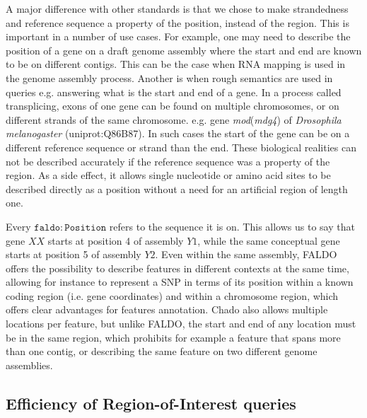 A major difference with other standards is that we chose to make strandedness and reference sequence a property of the position, instead of the region.
This is important in a number of use cases.
For example, one may need to describe the position of a gene on a draft genome assembly where the start and end are known to be on different contigs.
This can be the case when RNA mapping is used in the genome assembly process.
Another is when rough semantics are used in queries e.g. answering what is the start and end of a gene. 
In a process called transplicing, exons of one gene can be found on multiple chromosomes, or on different strands of the same chromosome.
e.g.  gene \textit{mod}(\textit{mdg4}) of \textit{Drosophila melanogaster} (uniprot:Q86B87).
In such cases the start of the gene can be on a different reference sequence or strand than the end.
These biological realities can not be described accurately if the reference sequence was a property of the region. 
As a side effect, it allows single nucleotide or amino acid sites to be described directly as a position without a need for an artificial region of length one.


Every $\mathtt{faldo\colon{}Position}$ refers to the sequence it is on.
This allows us to say that gene $XX$ starts at position 4 of assembly $Y1$,
while the same conceptual gene starts at position 5 of assembly $Y2$.
Even within the same assembly, FALDO offers the possibility to describe features in different contexts at the same time, allowing for instance to represent a SNP in terms of its position within a known coding region (i.e. gene coordinates) and within a chromosome region, which offers clear advantages for features annotation.
Chado also allows multiple locations per feature, but unlike FALDO,
the start and end of any location must be in the same region,
which prohibits for example a feature that spans more than one contig,
or describing the same feature on two different genome assemblies.

\subsection*{Efficiency of Region-of-Interest queries}

